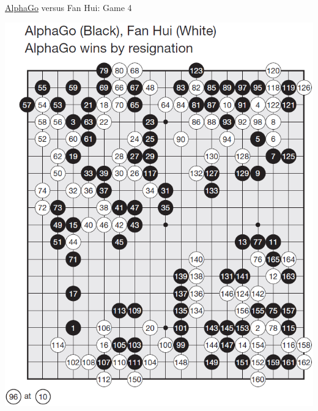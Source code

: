 \documentclass{beamer}
\begin{document}
{    \begin{frame}{{\color{black}\underline{AlphaGo}} versus {\color{white}Fan Hui}: Game 4}
      \begin{center}
        \includegraphics[height=.9\textheight]{../img/AlphaGo_vs_Fan_Hui_Game_4.png}
      \end{center}
    \end{frame}

}
\end{document}
